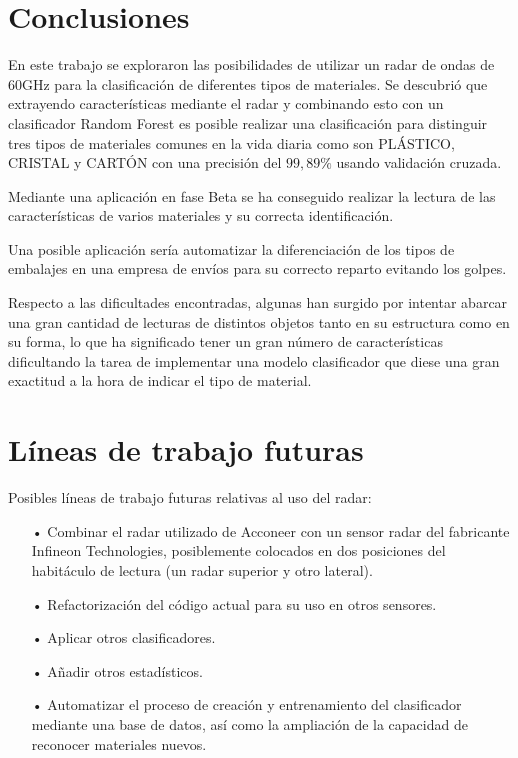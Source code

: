 
\section{Conclusiones}

En este trabajo se exploraron las posibilidades de utilizar un radar de ondas de 60GHz para la clasificación de diferentes tipos de materiales. Se descubrió que extrayendo características mediante el radar y combinando esto con un clasificador Random Forest es posible realizar una clasificación  para distinguir tres tipos de materiales comunes en la vida diaria como son PLÁSTICO, CRISTAL y CARTÓN con una precisión del $ 99,89\% $ usando validación cruzada. 

Mediante una aplicación en fase Beta se ha conseguido realizar la lectura de las características de varios materiales y su correcta identificación.

Una posible aplicación sería automatizar la diferenciación de los tipos de embalajes en una empresa de envíos para su correcto reparto evitando los golpes.

Respecto a las dificultades encontradas, algunas han surgido por intentar abarcar una gran cantidad de lecturas de distintos objetos tanto en su estructura como en su forma, lo que ha significado tener un gran número de características dificultando la tarea de implementar una modelo clasificador que diese una gran exactitud a la hora de indicar el tipo de material.

\section{Líneas de trabajo futuras}

Posibles líneas de trabajo futuras relativas al uso del radar:

\begin{itemize}
\item[•] Combinar el radar utilizado de Acconeer con un sensor radar del fabricante Infineon Technologies, posiblemente colocados en dos posiciones del habitáculo de lectura (un radar superior y otro lateral).
\item[•] Refactorización del código actual para su uso en otros sensores.
\item[•] Aplicar otros clasificadores.
\item[•]Añadir otros estadísticos.
\item[•] Automatizar el proceso de creación y entrenamiento del clasificador mediante una base de datos, así como la ampliación de la capacidad de reconocer materiales nuevos.
\end{itemize}

